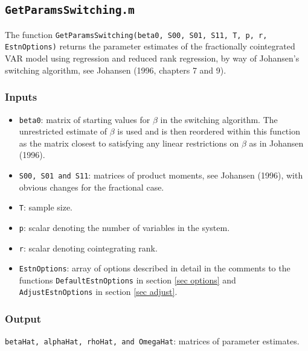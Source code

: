 \documentclass[12pt]{article}
\begin{document}
\subsection{\texttt{GetParamsSwitching.m}}

The function \texttt{GetParamsSwitching(beta0, S00, S01, S11, T, p, r, EstnOptions)} returns the parameter estimates of the fractionally cointegrated VAR model using regression and reduced rank regression, by way of Johansen's switching algorithm, see Johansen (1996, chapters 7 and 9).


\subsubsection*{Inputs}

\begin{itemize}

\item \texttt{beta0}: matrix of starting values for $\beta$ in the switching algorithm. The unrestricted estimate of $\beta$ is used and is then reordered within this function as the matrix closest to satisfying any linear restrictions on $\beta$ as in Johansen (1996).

\item \texttt{S00, S01 and S11}: matrices of product moments, see Johansen (1996), with obvious changes for the fractional case.

\item \texttt{T}: sample size.

\item \texttt{p}: scalar denoting the number of variables in the system.

\item \texttt{r}: scalar denoting cointegrating rank.

\item \texttt{EstnOptions}: array of options described in detail in the comments to the functions \texttt{DefaultEstnOptions} in section \ref{sec options} and \texttt{AdjustEstnOptions} in section \ref{sec adjust}. 

\end{itemize}


\subsubsection*{Output}

\texttt{betaHat, alphaHat, rhoHat, and OmegaHat}: matrices of parameter estimates. 
 
\end{document}
